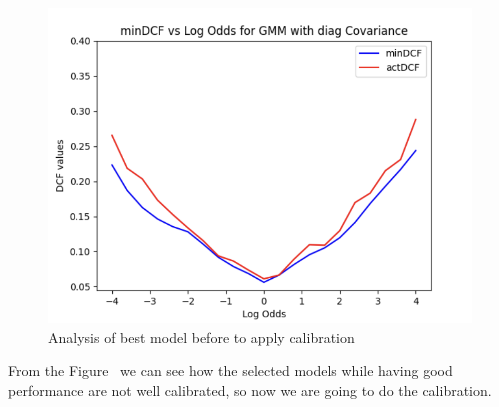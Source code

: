 \documentclass{article}
\begin{document}
\begin{figure}[H]
\begin{minipage}{.3\textwidth}
    \end{minipage}
    \begin{minipage}{.3\textwidth}
        \centering
        \includegraphics[width=\linewidth]{./img/BestGMM.png}
    \end{minipage}
    \caption{Analysis of best model before to apply calibration} %
    \label{fig:CalAnal} %
\end{figure}
From the Figure~ we can see how the selected models while having good performance are not well calibrated, so now we are going to do the calibration.
\end{document}
